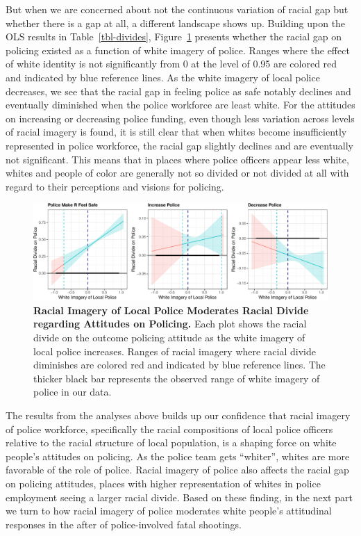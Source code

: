 \documentclass[
  12pt,
]{article}
\begin{document}
But when we are concerned about not the continuous variation of racial
gap but whether there is a gap at all, a different landscape shows up.
Building upon the OLS results in Table~\ref{tbl-divides},
Figure~\ref{fig-divides} presents whether the racial gap on policing
existed as a function of white imagery of police. Ranges where the
effect of white identity is not significantly from 0 at the level of
0.95 are colored red and indicated by blue reference lines. As the white
imagery of local police decreases, we see that the racial gap in feeling
police as safe notably declines and eventually diminished when the
police workforce are least white. For the attitudes on increasing or
decreasing police funding, even though less variation across levels of
racial imagery is found, it is still clear that when whites become
insufficiently represented in police workforce, the racial gap slightly
declines and are eventually not significant. This means that in places
where police officers appear less white, whites and people of color are
generally not so divided or not divided at all with regard to their
perceptions and visions for policing.

\begin{figure}[t]

{\centering \includegraphics{racialized-police_files/figure-pdf/fig-divides-1.pdf}

}

\caption{\label{fig-divides}\textbf{Racial Imagery of Local Police
Moderates Racial Divide regarding Attitudes on Policing.} Each plot
shows the racial divide on the outcome policing attitude as the white
imagery of local police increases. Ranges of racial imagery where racial
divide diminishes are colored red and indicated by blue reference lines.
The thicker black bar represents the observed range of white imagery of
police in our data.}

\end{figure}

The results from the analyses above builds up our confidence that racial
imagery of police workforce, specifically the racial compositions of
local police officers relative to the racial structure of local
population, is a shaping force on white people's attitudes on policing.
As the police team gets ``whiter'', whites are more favorable of the
role of police. Racial imagery of police also affects the racial gap on
policing attitudes, places with higher representation of whites in
police employment seeing a larger racial divide. Based on these finding,
in the next part we turn to how racial imagery of police moderates white
people's attitudinal responses in the after of police-involved fatal
shootings.
\end{document}
